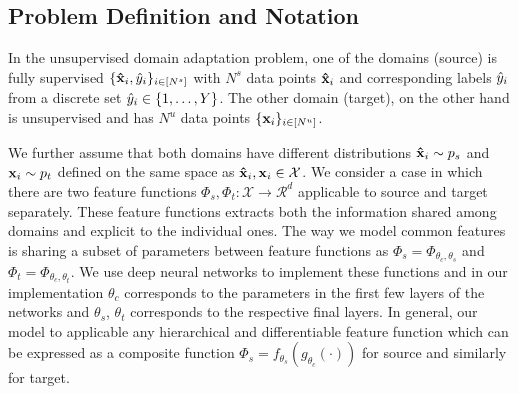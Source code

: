 
\subsection{Problem Definition and Notation}
\label{prob:def}
In the unsupervised domain adaptation problem, one of the domains (source) is fully supervised $\{\mathbf{\hat{x}}_i, \hat{y}_i \}_{i \in [N^s]}$ with $N^s$ data points $\mathbf{\hat{x}}_i$ and corresponding labels $\hat{y}_i$ from a discrete set $\hat{y}_i \in \{1,\ldots, Y \}$.  The other domain (target), on the other hand is unsupervised and has $N^u$ data points $\{\mathbf{x}_i \}_{i \in [N^u]}$. 

We further assume that both domains have different distributions $\mathbf{\hat{x}}_i \sim p_s$ and $\mathbf{x}_i \sim p_t$ defined on the same space as $\mathbf{\hat{x}}_i,\mathbf{x}_i \in \mathcal{X}$. We consider a case in which there are two feature functions  \mbox{$\Phi_s, \Phi_t:\mathcal{X}\rightarrow \mathcal{R}^d$} applicable to source and target separately. These feature functions extracts both the information shared among domains and explicit to the individual ones. The way we model common features is sharing a subset of parameters between feature functions as \mbox{$\Phi_s=\Phi_{\theta_c,\theta_s}$} and \mbox{$\Phi_t=\Phi_{\theta_c,\theta_t}$}. We use deep neural networks to implement these functions and in our implementation $\theta_c$ corresponds to the parameters in the first few layers of the networks and $\theta_s$, $\theta_t$ corresponds to the respective final layers. In general, our model to applicable any hierarchical and differentiable feature function which can be expressed as a composite function $\Phi_s = f_{\theta_s}(g_{\theta_c}(\cdot))$ for source and similarly for target.

